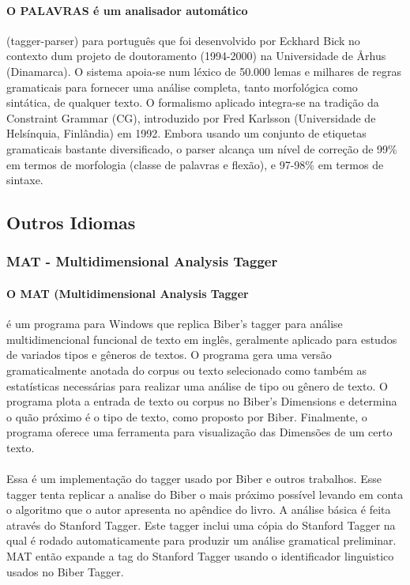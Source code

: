 \documentclass[a4paper, 10pt]{article}
\begin{document}
            	\paragraph{O PALAVRAS é um analisador automático} (tagger-parser) para português que foi desenvolvido por Eckhard Bick no contexto dum projeto de doutoramento (1994-2000) na Universidade de Århus (Dinamarca). O sistema apoia-se num léxico de 50.000 lemas e milhares de regras gramaticais para fornecer uma análise completa, tanto morfológica como sintática, de qualquer texto. O formalismo aplicado integra-se na tradição da Constraint Grammar (CG), introduzido por Fred Karlsson (Universidade de Helsínquia, Finlândia) em 1992. Embora usando um conjunto de etiquetas gramaticais bastante diversificado, o parser alcança um nível de correção de 99\% em termos de morfologia (classe de palavras e flexão), e 97-98\% em termos de sintaxe.

        \subsection{Outros Idiomas}
        	\subsubsection{MAT - Multidimensional Analysis Tagger}
            	\paragraph{O MAT (Multidimensional Analysis Tagger} é um programa para Windows que replica Biber's tagger para análise multidimencional funcional de texto em inglês, geralmente aplicado para estudos de variados tipos e gêneros de textos. O programa gera uma versão gramaticalmente anotada do corpus ou texto selecionado como também as estatísticas necessárias para realizar uma análise de tipo ou gênero de texto. O programa plota a entrada de texto ou corpus no Biber's Dimensions e determina o quão próximo é o tipo de texto, como proposto por Biber. Finalmente, o programa oferece uma ferramenta para visualização das Dimensões de um certo texto.
                \paragraph{}Essa é um implementação do tagger usado por Biber e outros trabalhos. Esse tagger tenta replicar a analise do Biber o mais próximo possível levando em conta o algoritmo que o autor apresenta no apêndice do livro. A análise básica é feita através do Stanford Tagger. Este tagger inclui uma cópia do Stanford Tagger na qual é rodado automaticamente para produzir um análise gramatical preliminar. MAT então expande a tag do Stanford Tagger usando o identificador linguistico usados no Biber Tagger. 
                
\end{document}

